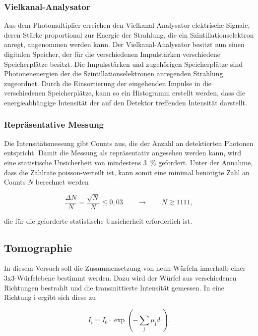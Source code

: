         \subsubsection*{Vielkanal-Analysator}
          Aus dem Photomultiplier erreichen den Vielkanal-Analysator elektrische Signale, deren Stärke proportional zur Energie der Strahlung, die ein Szintillationselektron anregt, angenommen werden kann. 
          Der Vielkanal-Analysator besitzt nun einen digitalen Speicher, der für die verschiedenen Impulstärken verschiedene Speicherplätze besitzt. Die Impulsstärken und zugehörigen Speicherplätze sind
          Photonenenergien der die Szintillationselektronen anregenden Strahlung zugeordnet. Durch die Einsortierung der eingehenden Impulse in die verschiedenen Speicherplätze, kann so 
          ein Histogramm erstellt werden, dass die energieabhängige Intensität der auf den Detektor treffenden Intensität darstellt.

        \subsubsection*{Repräsentative Messung}
          Die Intensitätsmessung gibt Counts aus, die der Anzahl an detektierten Photonen entspricht. Damit die Messung als repräsentativ angesehen werden kann, wird eine statistische Unsicherheit von 
          mindestens \SI{3}{\percent} gefordert. Unter der Annahme, dass die Zählrate poisson-verteilt ist, kann somit eine minimal benötigte Zahl an Counts $N$ berechnet werden

          \begin{equation*}
            \frac{\Delta N}{N} = \frac{\sqrt{N}}{N} \le 0,03 \qquad \rightarrow \qquad N \gtrsim 1111,
          \end{equation*}

          die für die geforderte statistische Unsicherheit erforderlich ist.

      \newpage
      \subsection{Tomographie}
          In diesem Versuch soll die Zusammensetzung von neun Würfeln innerhalb einer 3x3-Würfelebene bestimmt werden. Dazu wird der Würfel aus verschiedenen Richtungen bestrahlt und die transmittierte 
          Intensität gemessen. In eine Richtung i ergibt sich diese zu

          \begin{equation}
            I_{\text{i}} = I_0 \cdot \exp\left(-\sum_{\text{j}} \mu_{\text{j}} d_{\text{j}} \right).
            \label{eqn:I_i}
          \end{equation}

